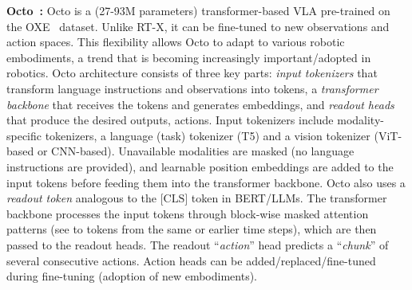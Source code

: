 \documentclass[11pt,letterpaper]{article}
\begin{document}
\noindent\textbf{ Octo~\cite{team2024octo}:} Octo is a (27-93M parameters) transformer-based VLA pre-trained on the OXE~\cite{9} dataset. Unlike RT-X, it can be fine-tuned to new observations and action spaces. This flexibility allows Octo to adapt to various robotic embodiments, a trend that is becoming increasingly important/adopted in robotics.
Octo architecture consists of three key parts: \textit{input tokenizers} that transform language instructions and observations into tokens, a \textit{transformer backbone} that receives the tokens and generates embeddings, and \textit{readout heads} that produce the desired outputs, \ie actions. Input tokenizers include modality-specific tokenizers, \ie a language (task) tokenizer (\eg T5) and a vision tokenizer (\eg ViT-based or CNN-based). Unavailable 
modalities are masked (\eg no language instructions are provided), and learnable position embeddings are added to the input tokens before feeding them into the transformer backbone.  Octo also uses a \textit{readout token} analogous to the $\text{[CLS]}$ token in BERT/LLMs.
The transformer backbone processes the input tokens through block-wise masked attention patterns (\ie see to tokens from the same or earlier time steps), which are then passed to the readout heads. The readout ``\textit{action}'' head predicts a ``\textit{chunk}'' of several consecutive actions.
Action heads can be added/replaced/fine-tuned during fine-tuning (\eg adoption of new embodiments).
\end{document}
